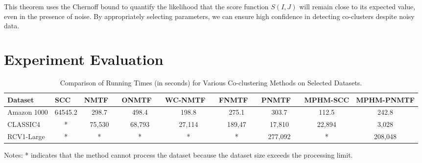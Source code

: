 \documentclass[journal]{IEEEtran}
\renewcommand{\cite}[1]{~\autocite{#1}}
\begin{document}
This theorem uses the Chernoff bound to quantify the likelihood that the score function $S(I,J)$ will remain close to its expected value, even in the presence of noise. By appropriately selecting parameters, we can ensure high confidence in detecting co-clusters despite noisy data.

\section{Experiment Evaluation}
\label{sec:experiment}


\begin{table}[htbp]
  \centering
  \caption{Comparison of Running Times (in seconds) for Various Co-clustering Methods on Selected Datasets.}
  \label{tab:running-time}
  \begin{tabular}{@{} l cccccccc @{}}
    \toprule
    Dataset     & SCC \cite{dhillon2001CoclusteringDocumentsWords}
                & NMTF \cite{long2005CoclusteringBlockValue}
                & ONMTF \cite{ding2006OrthogonalNonnegativeMatrix}
                & WC-NMTF \cite{salah2018WordCooccurrenceRegularized}
                & FNMTF \cite{kim2011FastNonnegativeMatrix}
                & PNMTF \cite{chen2023ParallelNonNegativeMatrix}      & \textbf{MPHM-SCC} & \textbf{MPHM-PNMTF}                                                \\
    \midrule
    Amazon 1000 & 64545.2                                             & 298.7             & 498.4               & 198.8  & 275.1  & 303.7   & 112.5  & 242.8   \\
    CLASSIC4    & *                                                   & 75,530            & 68,793              & 27,114 & 189,47 & 17,810  & 22,894 & 3,028   \\
    RCV1-Large  & *                                                   & *                 & *                   & *      & *      & 277,092 & *      & 208,048 \\
    \bottomrule
  \end{tabular}
  \begin{tablenotes}
    \small
    \item Notes: * indicates that the method cannot process the dataset because the dataset size exceeds the processing limit.
  \end{tablenotes}
\end{table}
\end{document}
